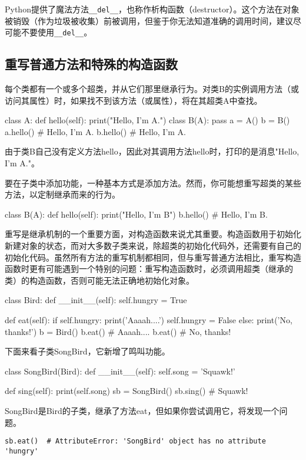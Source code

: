 \begin{tcolorbox}
Python提供了魔法方法\verb|__del__|，也称作析构函数（destructor）。这个方法在对象被销毁（作为垃圾被收集）前被调用，但鉴于你无法知道准确的调用时间，建议尽可能不要使用\verb|__del__|。
\end{tcolorbox}
\subsection{重写普通方法和特殊的构造函数}
每个类都有一个或多个超类，并从它们那里继承行为。对类B的实例调用方法（或访问其属性）时，如果找不到该方法（或属性），将在其超类A中查找。

\begin{pyc}
class A:
    def hello(self):
        print("Hello, I'm A.")
class B(A):
    pass
a = A()
b = B()
a.hello()  # Hello, I'm A.
b.hello()  # Hello, I'm A.
\end{pyc}
由于类B自己没有定义方法hello，因此对其调用方法hello时，打印的是消息"Hello, I'm A."。

要在子类中添加功能，一种基本方式是添加方法。然而，你可能想重写超类的某些方法，以定制继承而来的行为。
\begin{pyc}
class B(A):
    def hello(self):
        print("Hello, I'm B")
b.hello()  # Hello, I'm B.
\end{pyc}

重写是继承机制的一个重要方面，对构造函数来说尤其重要。构造函数用于初始化新建对象的状态，而对大多数子类来说，除超类的初始化代码外，还需要有自己的初始化代码。虽然所有方法的重写机制都相同，但与重写普通方法相比，重写构造函数时更有可能遇到一个特别的问题：重写构造函数时，必须调用超类（继承的类）的构造函数，否则可能无法正确地初始化对象。
\begin{pyc}
class Bird:
    def __init__(self):
        self.hungry = True

    def eat(self):
        if self.hungry:
            print('Aaaah....')
            self.hungry = False
        else:
            print('No, thanks!')
b = Bird()
b.eat()  # Aaaah....
b.eat()  # No, thanks!
\end{pyc}
下面来看子类SongBird，它新增了鸣叫功能。
\begin{pyc}
class SongBird(Bird):
    def __init__(self):
        self.song = 'Squawk!'

    def sing(self):
        print(self.song)
sb = SongBird()
sb.sing()  # Squawk!
\end{pyc}
SongBird是Bird的子类，继承了方法eat，但如果你尝试调用它，将发现一个问题。

\verb|sb.eat()  # AttributeError: 'SongBird' object has no attribute 'hungry'|


